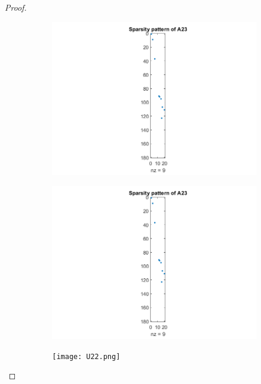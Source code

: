 \documentclass[12pt]{report}
\begin{document}
\begin{problem}
\begin{proof}
\begin{figure}[H]
  \begin{subfigure}[b]{0.5\linewidth}
    \centering
    \includegraphics[width=\linewidth]{A23.png}
    \caption{}
    \label{fig1:a}
    \vspace{4ex}
  \end{subfigure}%
  \begin{subfigure}[b]{0.5\linewidth}
    \centering
    \includegraphics[width=\linewidth]{A23.png}
    \caption{}
    \label{fig1:b}
    \vspace{4ex}
  \end{subfigure}
  \begin{subfigure}[b]{0.5\linewidth}
    \centering
    \texttt{[image: U22.png]}

\end{subfigure}
\end{figure}
\end{proof}
\end{problem}
\end{document}
